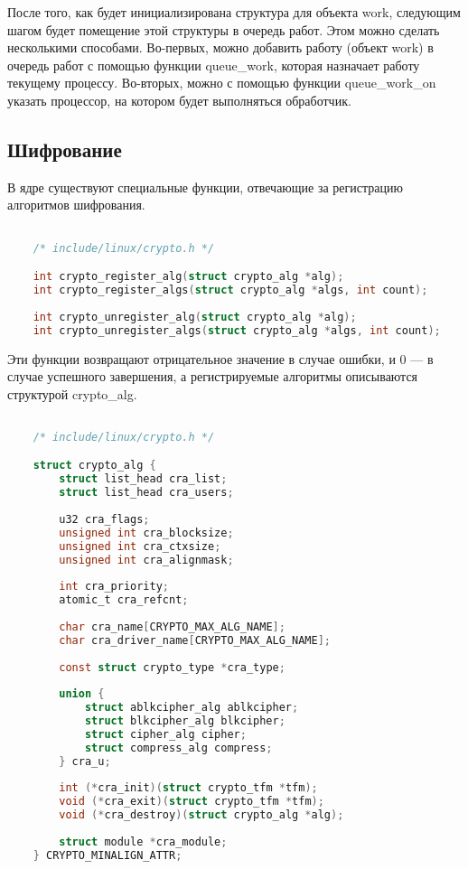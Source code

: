 После того, как будет инициализирована структура для объекта work, следующим шагом будет помещение этой структуры в очередь работ.
Этом можно сделать несколькими способами. 
Во-первых, можно добавить работу (объект work) в очередь работ с помощью функции queue\_work,
которая назначает работу текущему процессу.
Во-вторых, можно с помощью функции queue\_work\_on указать процессор, на котором будет выполняться обработчик.


\subsection{Шифрование}

В ядре существуют специальные функции, отвечающие за регистрацию алгоритмов шифрования.

\begin{lstlisting}[language=c, label=some-code, caption=Регистрация алгоритмов шифрования.]

    /* include/linux/crypto.h */

    int crypto_register_alg(struct crypto_alg *alg);
    int crypto_register_algs(struct crypto_alg *algs, int count);
    
    int crypto_unregister_alg(struct crypto_alg *alg);
    int crypto_unregister_algs(struct crypto_alg *algs, int count);

\end{lstlisting}

Эти функции возвращают отрицательное значение в случае ошибки, и 0 --- в случае успешного завершения,
а регистрируемые алгоритмы описываются структурой crypto\_alg.

\begin{lstlisting}[language=c, label=some-code, caption=Структура crypto\_alg]

    /* include/linux/crypto.h */

    struct crypto_alg {
        struct list_head cra_list;
        struct list_head cra_users;
    
        u32 cra_flags;
        unsigned int cra_blocksize;
        unsigned int cra_ctxsize;
        unsigned int cra_alignmask;
    
        int cra_priority;
        atomic_t cra_refcnt;
    
        char cra_name[CRYPTO_MAX_ALG_NAME];
        char cra_driver_name[CRYPTO_MAX_ALG_NAME];
    
        const struct crypto_type *cra_type;
    
        union {
            struct ablkcipher_alg ablkcipher;
            struct blkcipher_alg blkcipher;
            struct cipher_alg cipher;
            struct compress_alg compress;
        } cra_u;
    
        int (*cra_init)(struct crypto_tfm *tfm);
        void (*cra_exit)(struct crypto_tfm *tfm);
        void (*cra_destroy)(struct crypto_alg *alg);
    
        struct module *cra_module;
    } CRYPTO_MINALIGN_ATTR;
    
\end{lstlisting}

